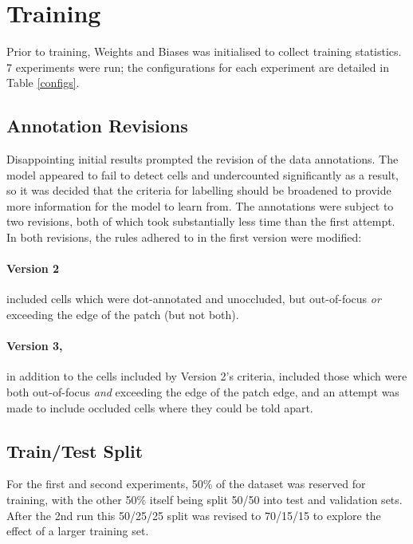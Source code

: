 \section{Training}
Prior to training, Weights and Biases was initialised to collect training statistics. 7 experiments were run; the configurations for each experiment are detailed in Table \ref{configs}.

\subsection{Annotation Revisions}
Disappointing initial results prompted the revision of the data annotations. The model appeared to fail to detect cells and undercounted significantly as a result, so it was decided that the criteria for labelling should be broadened to provide more information for the model to learn from. The annotations were subject to two revisions, both of which took substantially less time than the first attempt. In both revisions, the rules adhered to in the first version were modified:\\

\paragraph{Version 2} included cells which were dot-annotated and unoccluded, but out-of-focus \emph{or} exceeding the edge of the patch (but not both).\\

\paragraph{Version 3,} in addition to the cells included by Version 2's criteria, included those which were both out-of-focus \emph{and} exceeding the edge of the patch edge, and an attempt was made to include occluded cells where they could be told apart.\\
 
\subsection{Train/Test Split}
For the first and second experiments, 50\% of the dataset was reserved for training, with the other 50\% itself being split 50/50 into test and validation sets. After the 2nd run this 50/25/25 split was revised to 70/15/15 to explore the effect of a larger training set.\\


